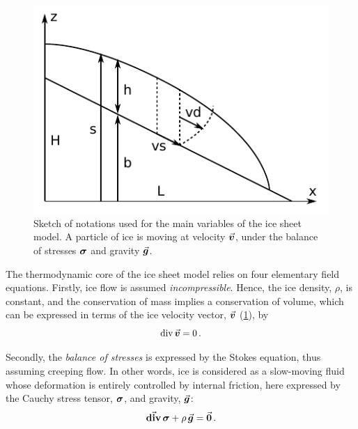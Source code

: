 \documentclass{article}
\newcommand{\vect}[1]{\va*{#1}} %
\newcommand{\tens}[1]{\vb*{#1}} %
\renewcommand{\div}[1]{\mathrm{div}\,#1}            %
\newcommand{\tdiv}[1]{\vect{\mathrm{div}}\,#1}      %
\newcommand{\CST}[0]{\tens{\sigma}}     %
\newcommand{\vv}[0]{\vect{v}}           %
\begin{document}
\begin{figure}
  \centering
  \includegraphics{model-variables}
  \caption{Sketch of notations used for the main variables of the ice sheet
           model. A particle of ice is moving at velocity $\vv$, under the
           balance of stresses $\CST$ and gravity $\vect{g}$.}
  \label{fig:model-variables}
\end{figure}

The thermodynamic core of the ice sheet model relies on four elementary field
equations. Firstly, ice flow is assumed \emph{incompressible}. Hence, the ice
density, $\rho$, is constant, and the
conservation of mass implies a conservation of volume, which can be expressed
in terms of the ice velocity vector, $\vv$ (\cref{fig:model-variables}), by
\begin{equation}
    \label{eqn:incompressibility}
    \div{\vv} = 0 \,.
\end{equation}

Secondly, the \emph{balance of stresses} is expressed by the Stokes equation,
thus assuming creeping flow. In other words, ice is considered as a slow-moving
fluid whose deformation is entirely controlled by internal friction, here
expressed by the Cauchy stress tensor, $\CST$, and gravity, $\vect{g}$:
\begin{equation}
    \label{eqn:stressbalance}
    \tdiv{\CST} + \rho\,\vect{g} = \vect{0} \,.
\end{equation}
\end{document}

